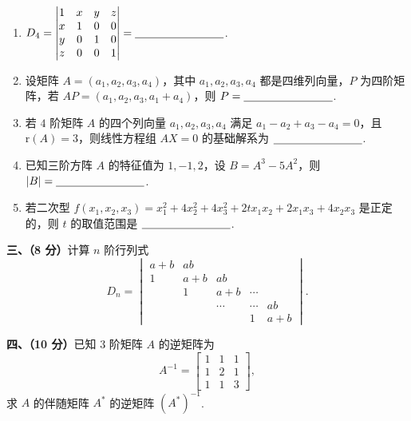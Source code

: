 \documentclass[a4paper,11pt]{ctexart}
\newcommand{\rk}{\mathrm{r}}
\newcommand{\blank}[1][2.8cm]{\underline{\hspace{#1}}}
\begin{document}
\begin{enumerate}[label=\arabic*., leftmargin=2em, itemsep=1.0em, topsep=0.5em]
  \item $D_4 = \begin{vmatrix}
      1 & x & y & z \\
      x & 1 & 0 & 0 \\
      y & 0 & 1 & 0 \\
      z & 0 & 0 & 1
    \end{vmatrix} = \blank$.

  \item 设矩阵 $A = (a_1, a_2, a_3, a_4)$，其中 $a_1, a_2, a_3, a_4$ 都是四维列向量，$P$ 为四阶矩阵，若 $AP = (a_1, a_2, a_3, a_1 + a_4)$，则 $P = \blank$.

  \item 若 $4$ 阶矩阵 $A$ 的四个列向量 $a_1, a_2, a_3, a_4$ 满足 $a_1 - a_2 + a_3 - a_4 = 0$，且 $\rk(A) = 3$，则线性方程组 $AX = 0$ 的基础解系为 $\blank$.

  \item 已知三阶方阵 $A$ 的特征值为 $1, -1, 2$，设 $B = A^3 - 5A^2$，则 $|B| = \blank$.

  \item 若二次型 $f(x_1, x_2, x_3) = x_1^2 + 4x_2^2 + 4x_3^2 + 2t x_1 x_2 + 2 x_1 x_3 + 4 x_2 x_3$ 是正定的，则 $t$ 的取值范围是 $\blank$.
\end{enumerate}

\vspace{0.9em}

\textbf{三、（8 分）}计算 $n$ 阶行列式
\[
  D_n = \begin{vmatrix}
    a + b & ab & & & \\
    1 & a + b & ab & & \\
    & 1 & a + b & \cdots & \\
    & & \cdots & \cdots & ab \\
    & & & 1 & a + b
  \end{vmatrix}.
\]

\vspace{0.6em}

\textbf{四、（10 分）}已知 $3$ 阶矩阵 $A$ 的逆矩阵为
\[
  A^{-1} = \begin{bmatrix}
    1 & 1 & 1 \\
    1 & 2 & 1 \\
    1 & 1 & 3
  \end{bmatrix},
\]
求 $A$ 的伴随矩阵 $A^*$ 的逆矩阵 $(A^*)^{-1}$.

\vspace{0.6em}
\end{document}

